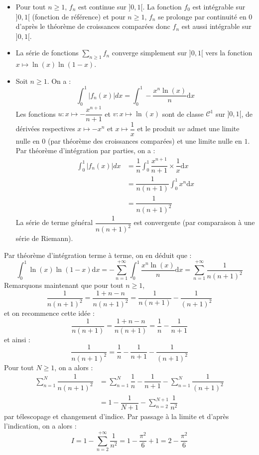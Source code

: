 \documentclass[a4paper,twoside,french,11pt]{VcCours}
\newcommand{\dx}{\text{d}x}
\begin{document}
\begin{corr}
\begin{enumerate}
\begin{itemize}
\item Pour tout $n \geq 1$, $f_n$ est continue sur $]0,1[$. La fonction $f_0$ est intégrable sur $]0,1[$ (fonction de référence) et pour $n \geq 1$, $f_n$ se prolonge par continuité en $0$ d'après le théorème de croissances comparées donc $f_n$ est aussi intégrable sur $]0,1[$.
\item La série de fonctions $\sum_{n \geq 1} f_n$ converge simplement sur $]0,1[$ vers la fonction $x \mapsto \ln(x) \ln(1-x)$.
\item Soit $n \geq 1$. On a :
$$\int_{0}^1 \vert f_n(x) \vert dx  = \int_{0}^1  - \dfrac{x^n \ln(x)}{n} \dx$$
Les fonctions $u: x \mapsto -\dfrac{x^{n+1}}{n+1}$ et $v: x \mapsto \ln(x)$ sont de classe $\mathcal{C}^1$ sur $]0,1[$, de dérivées respectives $x \mapsto -x^n$ et $x \mapsto \dfrac{1}{x}$ et le produit $uv$ admet une limite nulle en $0$ (par théorème des croissances comparées) et une limite nulle en $1$. Par théorème d'intégration par parties, on a :
\begin{align*}
\int_{0}^1 \vert f_n(x) \vert dx & = \dfrac{1}{n}\int_{0}^1 \dfrac{x^{n+1}}{n+1} \times \dfrac{1}{x} \dx \\
& = \dfrac{1}{n(n+1)} \int_{0}^1 x^n \dx \\
& = \dfrac{1}{n(n+1)^2} 
\end{align*}
La série de terme général $\dfrac{1}{n(n+1)^2}$ est convergente (par comparaison à une série de Riemann).
\end{itemize}
Par théorème d'intégration terme à terme, on en déduit que :
$$ \int_{0}^1 \ln(x)\ln(1-x) \dx = - \sum_{n=1}^{+ \infty} \int_{0}^1 \dfrac{x^n\ln(x)}{n} \dx = \sum_{n=1}^{+\infty} \dfrac{1}{n(n+1)^2}$$
Remarquons maintenant que pour tout $n \geq 1$,
$$ \dfrac{1}{n(n+1)^2} = \dfrac{1+n - n}{n(n+1)^2} = \dfrac{1}{n(n+1)}- \dfrac{1}{(n+1)^2}$$
et on recommence cette idée :
$$ \dfrac{1}{n(n+1)} = \dfrac{1+n-n}{n(n+1)} = \dfrac{1}{n}- \dfrac{1}{n+1}$$
et ainsi :
$$ \dfrac{1}{n(n+1)^2} = \dfrac{1}{n}- \dfrac{1}{n+1} - \dfrac{1}{(n+1)^2}$$
Pour tout $N \geq 1$, on a alors :
\begin{align*}
\sum_{n=1}^{N} \dfrac{1}{n(n+1)^2} & = \sum_{n=1}^{N}\dfrac{1}{n}- \dfrac{1}{n+1} -  \sum_{n=1}^{N} \dfrac{1}{(n+1)^2} \\
& = 1 - \dfrac{1}{N+1} - \sum_{n=2}^{N+1} \dfrac{1}{n^2} 
\end{align*}
par télescopage et changement d'indice. Par passage à la limite et d'après l'indication, on a alors :
$$ I = 1 - \sum_{n=2}^{+ \infty} \dfrac{1}{n^2} = 1 - \dfrac{\pi^2}{6} +1 = 2 - \dfrac{\pi^2}{6}$$

\end{enumerate}
\end{corr}
\end{document}
